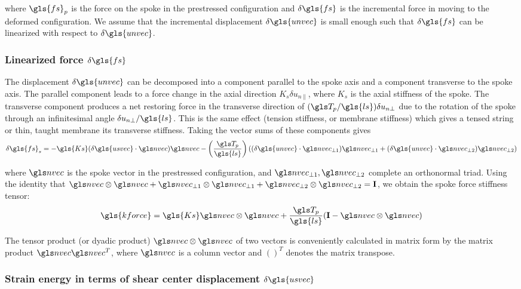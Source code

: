 \documentclass[\rootdir/thesis.tex]{subfiles}
\begin{document}
where $\gls{fs}_p$ is the force on the spoke in the prestressed configuration and $\delta\gls{fs}$ is the incremental force in moving to the deformed configuration. We assume that the incremental displacement $\delta\gls{unvec}$ is small enough such that $\delta\gls{fs}$ can be linearized with respect to $\delta\gls{unvec}$.

\subsubsection{Linearized force $\delta\gls{fs}$}

The displacement $\delta\gls{unvec}$ can be decomposed into a component parallel to the spoke axis and a component transverse to the spoke axis. The parallel component leads to a force change in the axial direction $K_s \delta u_{n\parallel}$, where $K_s$ is the axial stiffness of the spoke. The transverse component produces a net restoring force in the transverse direction of $(\T_p/\gls{ls}) \delta u_{n\perp}$ due to the rotation of the spoke through an infinitesimal angle $\delta u_{n\perp}/\gls{ls}$. This is the same effect (tension stiffness, or membrane stiffness) which gives a tensed string or thin, taught membrane its transverse stiffness. Taking the vector sums of these components gives
\begin{equation}
\label{eq:fs_us}
\delta\gls{fs}_s =
    -\gls{Ks} (\delta\gls{usvec} \cdot \n)\n -
    \left(\frac{\T_p}{\gls{ls}}\right) \left((\delta\gls{unvec} \cdot \npo) \npo +
                                             (\delta\gls{unvec} \cdot \npt) \npt \right)
\end{equation}

where $\n$ is the spoke vector in the prestressed configuration, and $\npo,\npt$ complete an orthonormal triad. Using the identity that $\n\otimes\n + \npo\otimes\npo + \npt\otimes\npt = \mathbf{I}$, we obtain the spoke force stiffness tensor:
\begin{equation}
\label{eq:kf}
\gls{kforce} = \gls{Ks} \n\otimes\n + \frac{\T_p}{\gls{ls}}(\mathbf{I} - \n\otimes\n)
\end{equation}

The tensor product (or dyadic product) $\n\otimes\n$ of two vectors is conveniently calculated in matrix form by the matrix product $\n\n^T$, where $\n$ is a column vector  and $()^T$ denotes the matrix transpose.

\subsubsection{Strain energy in terms of shear center displacement $\delta\gls{usvec}$}
\end{document}
